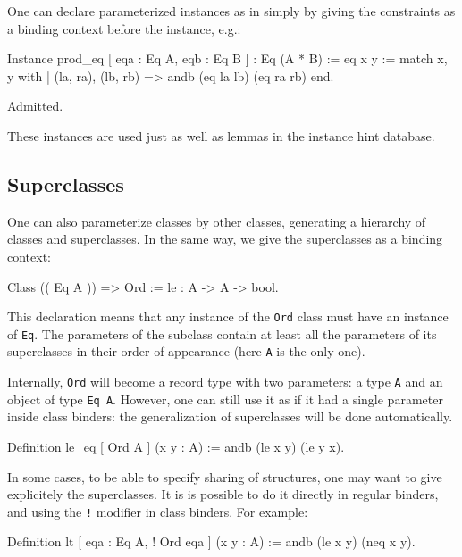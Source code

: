 
One can declare parameterized instances as in \Haskell simply by giving
the constraints as a binding context before the instance, e.g.:

\begin{coq_example*}
Instance prod_eq [ eqa : Eq A, eqb : Eq B ] : Eq (A * B) :=
  eq x y := match x, y with
  | (la, ra), (lb, rb) => andb (eq la lb) (eq ra rb)
  end.
\end{coq_example*}
\begin{coq_eval}
Admitted.
\end{coq_eval}

These instances are used just as well as lemmas in the instance hint database.


\subsection{Superclasses}
\label{classes:superclasses}
One can also parameterize classes by other classes, generating a
hierarchy of classes and superclasses. In the same way, we give the
superclasses as a binding context:

\begin{coq_example}
Class (( Eq A )) => Ord :=
  le : A -> A -> bool.
\end{coq_example}

This declaration means that any instance of the \texttt{Ord} class must
have an instance of \texttt{Eq}. The parameters of the subclass contain
at least all the parameters of its superclasses in their order of
appearance (here \texttt{A} is the only one). 

Internally, \texttt{Ord} will become a record type with two parameters:
a type \texttt{A} and an object of type \texttt{Eq A}. However, one can
still use it as if it had a single parameter inside class binders: the
generalization of superclasses will be done automatically. 
\begin{coq_example}
Definition le_eq [ Ord A ] (x y : A) :=
  andb (le x y) (le y x).
\end{coq_example}

In some cases, to be able to specify sharing of structures, one may want to give
explicitely the superclasses. It is is possible to do it directly in regular
binders, and using the \texttt{!} modifier in class binders. For
example:

\begin{coq_example*}
Definition lt [ eqa : Eq A, ! Ord eqa ] (x y : A) :=
  andb (le x y) (neq x y).
\end{coq_example*}

